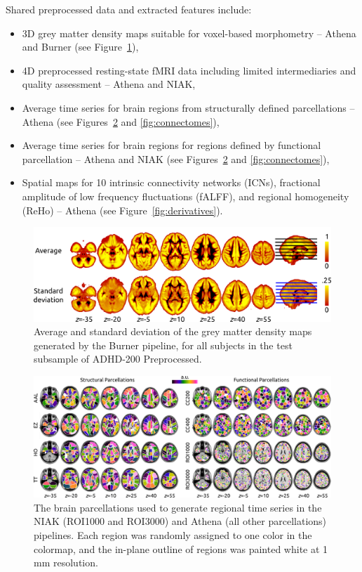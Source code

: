 \documentclass[preprint,12pt,3p]{elsarticle}
\providecommand{\tightlist}{%
  \setlength{\itemsep}{0pt}\setlength{\parskip}{0pt}}
\begin{document}
Shared preprocessed data and extracted features include:
\begin{itemize}
\tightlist
    \item 3D grey matter density maps suitable for voxel-based morphometry -- Athena and Burner (see Figure~\ref{fig:burner}),
    \item 4D preprocessed resting-state fMRI data including limited intermediaries and quality assessment -- Athena and NIAK,
    \item Average time series for brain regions from structurally defined parcellations -- Athena (see Figures~\ref{fig:parcels} and \ref{fig:connectomes}),
    \item Average time series for brain regions for regions defined by functional parcellation -- Athena and NIAK (see Figures~\ref{fig:parcels} and \ref{fig:connectomes}),
    \item Spatial maps for 10 intrinsic connectivity networks (ICNs), fractional amplitude of low frequency fluctuations (fALFF), and regional homogeneity (ReHo) -- Athena (see Figure~\ref{fig:derivatives}).
\end{itemize}

\begin{figure}[!t]
\begin{center}
  \includegraphics[width=0.6\linewidth]{fig_burner}
  \caption{Average and standard deviation of the grey matter density maps generated by the Burner pipeline, for all subjects in the test subsample of ADHD-200 Preprocessed. }
  \label{fig:burner}
\end{center}
\end{figure}

\begin{figure}[!t]
\begin{center}
  \includegraphics[width=\linewidth]{fig_parcels}
  \caption{The brain parcellations used to generate regional time series in the NIAK (ROI1000 and ROI3000) and Athena (all other parcellations) pipelines. Each region was randomly assigned to one color in the colormap, and the in-plane outline of regions was painted white at 1 mm resolution.}
  \label{fig:parcels}
\end{center}
\end{figure}
\end{document}
